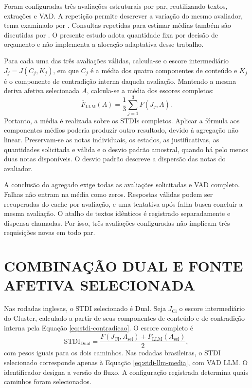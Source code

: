 Foram configuradas três avaliações estruturais por par, reutilizando textos, extrações e VAD. A repetição permite descrever a variação do mesmo avaliador, tema examinado por . Consultas repetidas para estimar médias também são discutidas por . O presente estudo adota quantidade fixa por decisão de orçamento e não implementa a alocação adaptativa desse trabalho.

Para cada uma das três avaliações válidas, calcula-se o escore intermediário $J_j=J(C_j,K_j)$, em que $C_j$ é a média dos quatro componentes de conteúdo e $K_j$ é o componente de contradição interna daquela avaliação. Mantendo a mesma deriva afetiva selecionada $A$, calcula-se a média dos escores completos:
\begin{equation}
 \overline{F}_{\mathrm{LLM}}(A)=\frac{1}{3}\sum_{j=1}^{3}F(J_j,A).
 \label{eq:stdi-llm-media}
\end{equation}
Portanto, a média é realizada sobre os STDIs completos. Aplicar a fórmula aos componentes médios poderia produzir outro resultado, devido à agregação não linear. Preservam-se as notas individuais, os estados, as justificativas, as quantidades solicitada e válida e o desvio padrão amostral, quando há pelo menos duas notas disponíveis. O desvio padrão descreve a dispersão das notas do avaliador.

A conclusão do agregado exige todas as avaliações solicitadas e VAD completo. Falhas não entram na média como zeros. Respostas válidas podem ser recuperadas do cache por avaliação, e uma tentativa após falha busca concluir a mesma avaliação. O atalho de textos idênticos é registrado separadamente e dispensa chamadas. Por isso, três avaliações configuradas não implicam três requisições novas em todo par.

\section{COMBINAÇÃO DUAL E FONTE AFETIVA SELECIONADA}

Nas rodadas inglesas, o STDI selecionado é Dual. Seja $J_{\mathrm{Cl}}$ o escore intermediário do Cluster, calculado a partir de seus componentes de conteúdo e de contradição interna pela Equação \ref{eq:stdi-contradicao}. O escore completo é
\begin{equation}
 \mathrm{STDI}_{\mathrm{Dual}}=
 \frac{F(J_{\mathrm{Cl}},A_{\mathrm{sel}})+\overline{F}_{\mathrm{LLM}}(A_{\mathrm{sel}})}{2},
 \label{eq:stdi-dual}
\end{equation}
com pesos iguais para os dois caminhos. Nas rodadas brasileiras, o STDI selecionado corresponde apenas à Equação \ref{eq:stdi-llm-media}, com VAD LLM. O identificador  designa a versão do fluxo. A configuração registrada determina quais caminhos foram selecionados.


